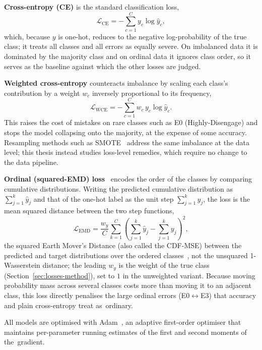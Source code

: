 \documentclass[../main.tex]{subfiles}
\begin{document}
\textbf{Cross-entropy (CE)} is the standard classification loss,
\begin{equation}
\mathcal{L}_{\text{CE}} = -\sum_{c=1}^{C} y_c \log \widehat{y}_c ,
\end{equation}
which, because $y$ is one-hot, reduces to the negative log-probability of the true class; it treats all classes and all errors as equally severe. On imbalanced data it is dominated by the majority class and on ordinal data it ignores class order, so it serves as the baseline against which the other losses are judged.

\textbf{Weighted cross-entropy} counteracts imbalance by scaling each class's contribution by a weight $w_c$ inversely proportional to its frequency,
\begin{equation}
\mathcal{L}_{\text{WCE}} = -\sum_{c=1}^{C} w_c\, y_c \log \widehat{y}_c .
\end{equation}
This raises the cost of mistakes on rare classes such as E0 (Highly\nobreakdash-Disengage) and stops the model collapsing onto the majority, at the expense of some accuracy. Resampling methods such as SMOTE~\cite{smote} address the same imbalance at the data level; this thesis instead studies loss-level remedies, which require no change to the data pipeline.

\textbf{Ordinal (squared-EMD) loss}~\cite{squared_emd} encodes the order of the classes by comparing cumulative distributions. Writing the predicted cumulative distribution as $\sum_{j=1}^{k}\widehat{y}_j$ and that of the one-hot label as the unit step $\sum_{j=1}^{k} y_j$, the loss is the mean squared distance between the two step functions,
\begin{equation}
\mathcal{L}_{\text{EMD}} = \frac{w_y}{C}\sum_{k=1}^{C}\left(\sum_{j=1}^{k}\widehat{y}_j-\sum_{j=1}^{k}y_j\right)^2 ,
\label{eq:emd}
\end{equation}
the squared Earth Mover's Distance (also called the CDF-MSE) between the predicted and target distributions over the ordered classes~\cite{squared_emd}, not the unsquared 1-Wasserstein distance; the leading $w_y$ is the weight of the true class (Section~\ref{sec:losses-method}), set to $1$ in the unweighted variant. Because moving probability mass across several classes costs more than moving it to an adjacent class, this loss directly penalises the large ordinal errors (E0$\leftrightarrow$E3) that accuracy and plain cross-entropy treat as~ordinary.

All models are optimised with Adam~\cite{adam}, an adaptive first-order optimiser that maintains per-parameter running estimates of the first and second moments of the~gradient.
\end{document}

